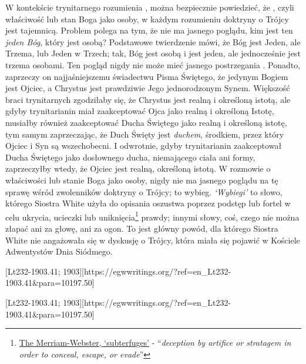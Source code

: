 W kontekście trynitarnego rozumienia , można bezpiecznie powiedzieć, że , czyli właściwość lub stan Boga jako osoby, w każdym rozumieniu doktryny o Trójcy jest tajemnicą. Problem polega na tym, że nie ma jasnego poglądu, kim jest ten \textit{jeden Bóg}, który jest osobą? Podstawowe twierdzenie mówi, że Bóg jest Jeden, ale Trzema, lub Jeden w Trzech; tak, Bóg jest osobą i jest jeden, ale jednocześnie jest trzema osobami. Ten pogląd nigdy nie może mieć jasnego postrzegania . Ponadto, zaprzeczy on najjaśniejszemu świadectwu Pisma Świętego, że jedynym Bogiem jest Ojciec, a Chrystus jest prawdziwie Jego jednorodzonym Synem. Większość braci trynitarnych zgodziłaby się, że Chrystus jest realną i określoną istotą, ale gdyby trynitarianin miał zaakceptować Ojca jako realną i określoną Istotę, musiałby również zaakceptować Ducha Świętego jako realną i określoną istotę, tym samym zaprzeczając, że Duch Święty jest \textit{duchem}, środkiem, przez który Ojciec i Syn są wszechobecni. I odwrotnie, gdyby trynitarianin zaakceptował Ducha Świętego jako dosłownego ducha, niemającego ciała ani formy, zaprzeczyłby wtedy, że Ojciec jest realną, określoną istotą. W rozmowie o właściwości lub stanie Boga jako osoby, nigdy nie ma jasnego poglądu na tę sprawę wśród zwolenników doktryny o Trójcy; to wybieg. \textit{‘Wybiegi’} to słowo, którego Siostra White użyła do opisania oszustwa poprzez podstęp lub fortel w celu ukrycia, ucieczki lub uniknięcia\footnote{\href{https://www.merriam-webster.com/dictionary/subterfuges}{The Merriam-Webster, ‘subterfuges’} - “\textit{deception by artifice or stratagem in order to conceal, escape, or evade}”} prawdy; innymi słowy, coś, czego nie można złapać ani za głowę, ani za ogon. To jest główny powód, dla którego Siostra White nie angażowała się w dyskusję o Trójcy, która miała się pojawić w Kościele Adwentystów Dnia Siódmego.


[Lt232-1903.41; 1903][https://egwwritings.org/?ref=en\_Lt232-1903.41&para=10197.50]


[Lt232-1903.41; 1903][https://egwwritings.org/?ref=en\_Lt232-1903.41&para=10197.50]


